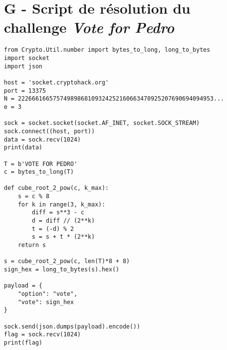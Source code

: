 \newpage %
\section*{G - Script de résolution du challenge \textit{Vote for Pedro}}
\label{annexe:script-vote}

\begin{lstlisting}
from Crypto.Util.number import bytes_to_long, long_to_bytes
import socket
import json

host = 'socket.cryptohack.org'
port = 13375
N = 22266616657574989868109324252160663470925207690694094953...
e = 3

sock = socket.socket(socket.AF_INET, socket.SOCK_STREAM)
sock.connect((host, port))
data = sock.recv(1024)
print(data)

T = b'VOTE FOR PEDRO'
c = bytes_to_long(T)

def cube_root_2_pow(c, k_max):
    s = c % 8
    for k in range(3, k_max):
        diff = s**3 - c
        d = diff // (2**k)
        t = (-d) % 2
        s = s + t * (2**k)
    return s

s = cube_root_2_pow(c, len(T)*8 + 8)
sign_hex = long_to_bytes(s).hex()

payload = {
    "option": "vote",
    "vote": sign_hex
}

sock.send(json.dumps(payload).encode())
flag = sock.recv(1024)
print(flag)

\end{lstlisting}